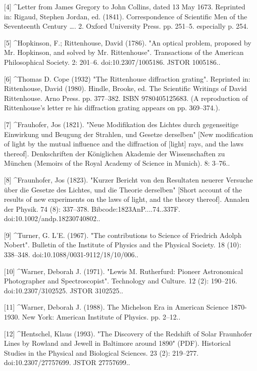 [4]
^Letter from James Gregory to John Collins, dated 13 May 1673. Reprinted in: Rigaud, Stephen Jordan, ed. (1841). Correspondence of Scientific Men of the Seventeenth Century …. 2. Oxford University Press. pp. 251–5. especially p. 254.

[5]
^Hopkinson, F.; Rittenhouse, David (1786). "An optical problem, proposed by Mr. Hopkinson, and solved by Mr. Rittenhouse". Transactions of the American Philosophical Society. 2: 201–6. doi:10.2307/1005186. JSTOR 1005186..

[6]
^Thomas D. Cope (1932) "The Rittenhouse diffraction grating". Reprinted in: Rittenhouse, David (1980). Hindle, Brooke, ed. The Scientific Writings of David Rittenhouse. Arno Press. pp. 377–382. ISBN 9780405125683. (A reproduction of Rittenhouse's letter re his diffraction grating appears on pp. 369–374.).

[7]
^Frauhofer, Jos (1821). "Neue Modifikation des Lichtes durch gegenseitige Einwirkung und Beugung der Strahlen, und Gesetze derselben" [New modification of light by the mutual influence and the diffraction of [light] rays, and the laws thereof]. Denkschriften der Königlichen Akademie der Wissenschaften zu München (Memoirs of the Royal Academy of Science in Munich). 8: 3–76..

[8]
^Fraunhofer, Jos (1823). "Kurzer Bericht von den Resultaten neuerer Versuche über die Gesetze des Lichtes, und die Theorie derselben" [Short account of the results of new experiments on the laws of light, and the theory thereof]. Annalen der Physik. 74 (8): 337–378. Bibcode:1823AnP....74..337F. doi:10.1002/andp.18230740802..

[9]
^Turner, G. L'E. (1967). "The contributions to Science of Friedrich Adolph Nobert". Bulletin of the Institute of Physics and the Physical Society. 18 (10): 338–348. doi:10.1088/0031-9112/18/10/006..

[10]
^Warner, Deborah J. (1971). "Lewis M. Rutherfurd: Pioneer Astronomical Photographer and Spectroscopist". Technology and Culture. 12 (2): 190–216. doi:10.2307/3102525. JSTOR 3102525..

[11]
^Warner, Deborah J. (1988). The Michelson Era in American Science 1870-1930. New York: American Institute of Physics. pp. 2–12..

[12]
^Hentschel, Klaus (1993). "The Discovery of the Redshift of Solar Fraunhofer Lines by Rowland and Jewell in Baltimore around 1890" (PDF). Historical Studies in the Physical and Biological Sciences. 23 (2): 219–277. doi:10.2307/27757699. JSTOR 27757699..


